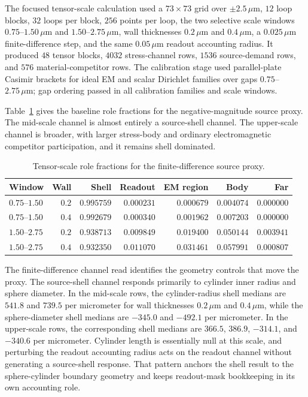 \documentclass[11pt]{article}
\newcommand{\um}{\,\mu\mathrm{m}}
\begin{document}
The focused tensor-scale calculation used a $73\times73$ grid over $\pm2.5\um$, $12$
loop blocks, $32$ loops per block, $256$ points per loop, the two selective
scale windows $0.75$--$1.50\um$ and $1.50$--$2.75\um$, wall thicknesses
$0.2\um$ and $0.4\um$, a $0.025\um$ finite-difference step, and the same
$0.05\um$ readout accounting radius. It produced $48$ tensor blocks, $4032$
stress-channel rows, $1536$ source-demand rows, and $576$ material-competitor
rows. The calibration stage used parallel-plate Casimir brackets for ideal EM
and scalar Dirichlet families over gaps $0.75$--$2.75\um$; gap ordering passed
in all calibration families and scale windows.

Table~\ref{tab:tensor_roles} gives the baseline role fractions for the
negative-magnitude source proxy. The mid-scale channel is almost entirely a
source-shell channel. The upper-scale channel is broader, with larger
stress-body and ordinary electromagnetic competitor participation, and it
remains shell dominated.

\begin{table}[htbp]
\centering
\caption{Tensor-scale role fractions for the finite-difference source proxy.}
\label{tab:tensor_roles}
\small
\begin{tabular}{lrrrrrr}
\toprule
Window & Wall & Shell & Readout & EM region & Body & Far \\
\midrule
$0.75$--$1.50$ & $0.2$ & $0.995759$ & $0.000231$ & $0.000679$ & $0.004074$ & $0.000000$ \\
$0.75$--$1.50$ & $0.4$ & $0.992679$ & $0.000340$ & $0.001962$ & $0.007203$ & $0.000000$ \\
$1.50$--$2.75$ & $0.2$ & $0.938713$ & $0.009849$ & $0.019400$ & $0.050144$ & $0.003941$ \\
$1.50$--$2.75$ & $0.4$ & $0.932350$ & $0.011070$ & $0.031461$ & $0.057991$ & $0.000807$ \\
\bottomrule
\end{tabular}
\end{table}

The finite-difference channel read identifies the geometry controls that move
the proxy. The source-shell channel responds primarily to cylinder inner radius
and sphere diameter. In the mid-scale rows, the cylinder-radius shell medians
are $541.8$ and $739.5$ per micrometer for wall thicknesses $0.2\um$ and
$0.4\um$, while the sphere-diameter shell medians are $-345.0$ and $-492.1$
per micrometer. In the upper-scale rows, the corresponding shell medians are
$366.5$, $386.9$, $-314.1$, and $-340.6$ per micrometer. Cylinder length is
essentially null at this scale, and perturbing the readout accounting radius
acts on the readout channel without generating a source-shell response. That
pattern anchors the shell result to the sphere-cylinder boundary geometry and
keeps readout-mask bookkeeping in its own accounting role.
\end{document}

